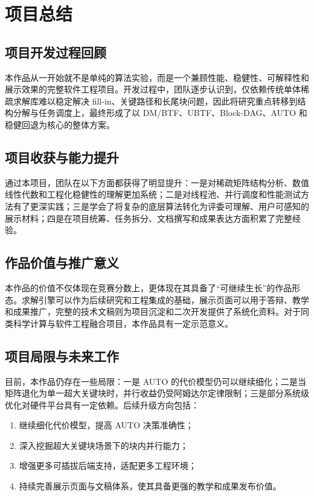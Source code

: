 \documentclass[12pt,a4paper,fontset=none]{ctexart}
\begin{document}
\section{项目总结}

\subsection{项目开发过程回顾}

本作品从一开始就不是单纯的算法实验，而是一个兼顾性能、稳健性、可解释性和展示效果的完整软件工程项目。开发过程中，团队逐步认识到，仅依赖传统单体稀疏求解库难以稳定解决 fill-in、关键路径和长尾块问题，因此将研究重点转移到结构分解与任务调度上，最终形成了以 DM/BTF、UBTF、Block-DAG、AUTO 和稳健回退为核心的整体方案。

\subsection{项目收获与能力提升}

通过本项目，团队在以下方面都获得了明显提升：一是对稀疏矩阵结构分析、数值线性代数和工程化稳健性的理解更加系统；二是对线程池、并行调度和性能测试方法有了更深实践；三是学会了将复杂的底层算法转化为评委可理解、用户可感知的展示材料；四是在项目统筹、任务拆分、文档撰写和成果表达方面积累了完整经验。

\subsection{作品价值与推广意义}

本作品的价值不仅体现在竞赛分数上，更体现在其具备了“可继续生长”的作品形态。求解引擎可以作为后续研究和工程集成的基础，展示页面可以用于答辩、教学和成果推广，完整的技术文稿则为项目沉淀和二次开发提供了系统化资料。对于同类科学计算与软件工程融合项目，本作品具有一定示范意义。

\subsection{项目局限与未来工作}

目前，本作品仍存在一些局限：一是 AUTO 的代价模型仍可以继续细化；二是当矩阵退化为单一超大关键块时，并行收益仍受阿姆达尔定律限制；三是部分系统级优化对硬件平台具有一定依赖。后续升级方向包括：
\begin{enumerate}
  \item 继续细化代价模型，提高 AUTO 决策准确性；
  \item 深入挖掘超大关键块场景下的块内并行能力；
  \item 增强更多可插拔后端支持，适配更多工程环境；
  \item 持续完善展示页面与文稿体系，使其具备更强的教学和成果发布价值。
\end{enumerate}
\end{document}
